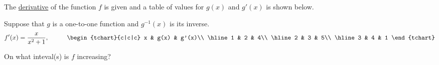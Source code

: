 \documentclass{ximera}
\author{Gregory Hartman \and Matthew Carr}
\begin{document}
\begin{exercise}



The \underline{derivative} of the function $f$ is given and a table of values for $g(x)$ and $g'(x)$ is shown below.

Suppose that $g$ is a one-to-one function and $g^{-1}(x)$ is its inverse.
\[
f'(x)=\frac{x}{x^2+1},\hskip 1cm
\begin{tchart}{c|c|c}
x & g(x) & g'(x)\\ \hline
1 & 2 & 4\\ \hline
2 & 3 & 5\\ \hline
3 & 4 & 1
\end{tchart}
\]

On what inteval(s) is $f$ increasing?
\begin{prompt}
\begin{multipleChoice}
\end{multipleChoice}
\end{prompt}

\end{exercise}
\end{document}
